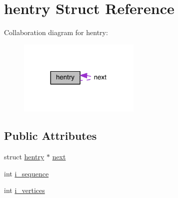 \hypertarget{structhentry}{\section{hentry Struct Reference}
\label{structhentry}
}


Collaboration diagram for hentry\+:
\nopagebreak
\begin{figure}[H]
\begin{center}
\leavevmode
\includegraphics[width=164pt]{structhentry__coll__graph}
\end{center}
\end{figure}
\subsection*{Public Attributes}
\begin{DoxyCompactItemize}
\item 
struct \hyperlink{structhentry}{hentry} $\ast$ \hyperlink{structhentry_a94f2927d851d194c036657b96aeb8a08}{next}
\item 
int \hyperlink{structhentry_a5411cfacc693173761cb14a6abe4e756}{i\+\_\+sequence}
\item 
int \hyperlink{structhentry_a72c714e369c96f7f198462dbc7a6e21d}{i\+\_\+vertices}
\end{DoxyCompactItemize}


